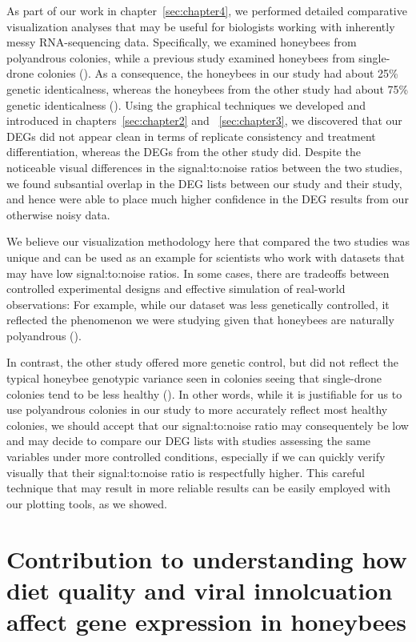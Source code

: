 \documentclass[11pt,a4paper,oldfontcommands,openany]{memoir}
\numberwithin{equation}{section} %
\begin{document}
As part of our work in chapter~\ref{sec:chapter4}, we performed detailed comparative visualization analyses that may be useful for biologists working with inherently messy RNA-sequencing data. Specifically, we examined honeybees from polyandrous colonies, while a previous study examined honeybees from single-drone colonies (\citealt{galbraith}). As a consequence, the honeybees in our study had about 25\% genetic identicalness, whereas the honeybees from the other study had about 75\% genetic identicalness (\citealt{sisters}). Using the graphical techniques we developed and introduced in chapters~\ref{sec:chapter2} and ~\ref{sec:chapter3}, we discovered that our DEGs did not appear clean in terms of replicate consistency and treatment differentiation, whereas the DEGs from the other study did. Despite the noticeable visual differences in the signal:to:noise ratios between the two studies, we found subsantial overlap in the DEG lists between our study and their study, and hence were able to place much higher confidence in the DEG results from our otherwise noisy data.

We believe our visualization methodology here that compared the two studies was unique and can be used as an example for scientists who work with datasets that may have low signal:to:noise ratios. In some cases, there are tradeoffs between controlled experimental designs and effective simulation of real-world observations: For example, while our dataset was less genetically controlled, it reflected the phenomenon we were studying given that honeybees are naturally polyandrous (\citealt{patriline}). 

In contrast, the other study offered more genetic control, but did not reflect the typical honeybee genotypic variance seen in colonies seeing that single-drone colonies tend to be less healthy (\citealt{geneticDiverse}). In other words, while it is justifiable for us to use polyandrous colonies in our study to more accurately reflect most healthy colonies, we should accept that our signal:to:noise ratio may consequentely be low and may decide to compare our DEG lists with studies assessing the same variables under more controlled conditions, especially if we can quickly verify visually that their signal:to:noise ratio is respectfully higher. This careful technique that may result in more reliable results can be easily employed with our plotting tools, as we showed.

\section{Contribution to understanding how diet quality and viral innolcuation affect gene expression in honeybees}
\end{document}
